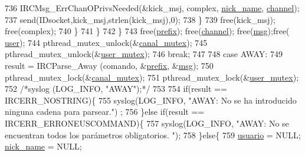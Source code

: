 \begin{DoxyCode}
{{{{{{{{{{736                                                         IRCMsg\_ErrChanOPrivsNeeded(&kick\_msj, complex, 
      \hyperlink{_g-2361-06-_p1-_server_8c_aabbf66718cda228b924a4a9441eadf62}{nick\_name}, \hyperlink{_g-2361-06-_p1-_server_8c_a842ca2f026578e5c479c095ff3335969}{channel});
737                                                         send(IDsocket,kick\_msj,strlen(kick\_msj),0);
738                                                 \}
739                                                 free(kick\_msj); free(complex);
740                                         \}
741                                 \}
742                         \}
743                         free(\hyperlink{_g-2361-06-_p1-_server_8c_ad2849cf781a4db22cc1b31eaaee50a4f}{prefix}); free(\hyperlink{_g-2361-06-_p1-_server_8c_a842ca2f026578e5c479c095ff3335969}{channel}); free(\hyperlink{_g-2361-06-_p1-_server_8c_a32d2f5216cddb59c7cc8fb2806a7e727}{msg});free(
      \hyperlink{_g-2361-06-_p1-_server_8c_a14871705f45ccdc5bb9f4549efd8e119}{user});
744                         pthread\_mutex\_unlock(&\hyperlink{_g-2361-06-_p1-_server_8c_ab86a544a49de18195048bac54dd3ac3e}{canal\_mutex});
745                         pthread\_mutex\_unlock(&\hyperlink{_g-2361-06-_p1-_server_8c_a5dedd07a1144d2ab70b74a8e64b6a7c0}{user\_mutex});
746                         \textcolor{keywordflow}{break};
747 
748                 \textcolor{keywordflow}{case} AWAY:
749                         result = IRCParse\_Away (comando, &\hyperlink{_g-2361-06-_p1-_server_8c_ad2849cf781a4db22cc1b31eaaee50a4f}{prefix}, &\hyperlink{_g-2361-06-_p1-_server_8c_a32d2f5216cddb59c7cc8fb2806a7e727}{msg});
750                         pthread\_mutex\_lock(&\hyperlink{_g-2361-06-_p1-_server_8c_ab86a544a49de18195048bac54dd3ac3e}{canal\_mutex});
751                         pthread\_mutex\_lock(&\hyperlink{_g-2361-06-_p1-_server_8c_a5dedd07a1144d2ab70b74a8e64b6a7c0}{user\_mutex});
752                         \textcolor{comment}{/*syslog (LOG\_INFO, "AWAY");*/}
753 
754                         \textcolor{keywordflow}{if}(result == IRCERR\_NOSTRING)\{
755                                 syslog(LOG\_INFO, \textcolor{stringliteral}{"AWAY: No se ha introducido ninguna cadena para parsear."})
      ;
756                         \}\textcolor{keywordflow}{else} \textcolor{keywordflow}{if}(result == IRCERR\_ERRONEUSCOMMAND)\{
757                                 syslog(LOG\_INFO, \textcolor{stringliteral}{"AWAY: No se encuentran todos los parámetros obligatorios.
      "});
758                         \}\textcolor{keywordflow}{else}\{
759                                 \hyperlink{_g-2361-06-_p1-_server_8c_a0147a5b81499984f9cb00379a8cb84af}{usuario} = NULL; \hyperlink{_g-2361-06-_p1-_server_8c_aabbf66718cda228b924a4a9441eadf62}{nick\_name} = NULL; 
}}}}}}}}}}
\end{DoxyCode}

